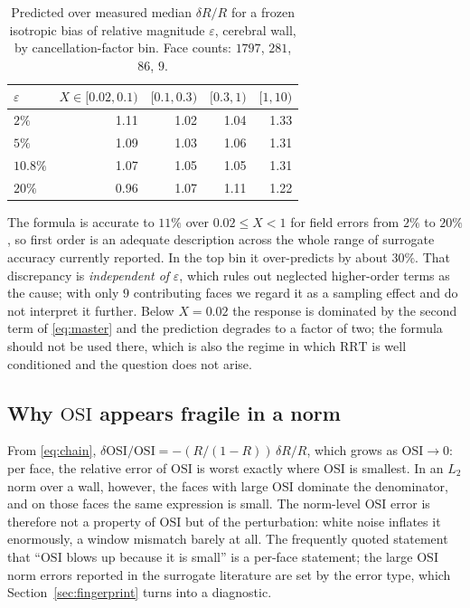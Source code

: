 \documentclass[11pt,a4paper]{article}
\newcommand{\OSI}{\mathrm{OSI}}
\newcommand{\RRT}{\mathrm{RRT}}
\newcommand{\eps}{\varepsilon}
\begin{document}
\begin{table}[t]
\centering
\caption{Predicted over measured median $\delta R/R$ for a frozen isotropic
bias of relative magnitude $\eps$, cerebral wall, by cancellation-factor bin.
Face counts: $1797$, $281$, $86$, $9$.}
\label{tab:validity}
\begin{tabular}{l r r r r}
\toprule
$\eps$ & $X\in[0.02,0.1)$ & $[0.1,0.3)$ & $[0.3,1)$ & $[1,10)$\\
\midrule
$2\%$    & 1.11 & 1.02 & 1.04 & 1.33\\
$5\%$    & 1.09 & 1.03 & 1.06 & 1.31\\
$10.8\%$ & 1.07 & 1.05 & 1.05 & 1.31\\
$20\%$   & 0.96 & 1.07 & 1.11 & 1.22\\
\bottomrule
\end{tabular}
\end{table}

The formula is accurate to $11\%$ over $0.02\le X<1$ for field errors from
$2\%$ to $20\%$, so first order is an adequate description across the whole
range of surrogate accuracy currently reported. In the top bin it
over-predicts by about $30\%$. That discrepancy is \emph{independent of}
$\eps$, which rules out neglected higher-order terms as the cause; with only
$9$ contributing faces we regard it as a sampling effect and do not interpret
it further. Below $X=0.02$ the response is dominated by the second term of
\eqref{eq:master} and the prediction degrades to a factor of two; the formula
should not be used there, which is also the regime in which $\RRT$ is well
conditioned and the question does not arise.

\subsection{Why $\OSI$ appears fragile in a norm}

From \eqref{eq:chain}, $\delta\OSI/\OSI=-(R/(1-R))\,\delta R/R$, which grows
as $\OSI\to0$: per face, the relative error of $\OSI$ is worst exactly where
$\OSI$ is smallest. In an $L_2$ norm over a wall, however, the faces with
large $\OSI$ dominate the denominator, and on those faces the same expression
is small. The norm-level $\OSI$ error is therefore not a property of $\OSI$
but of the perturbation: white noise inflates it enormously, a window
mismatch barely at all. The frequently quoted statement that ``$\OSI$ blows
up because it is small'' is a per-face statement; the large $\OSI$ norm
errors reported in the surrogate literature are set by the error type, which
Section~\ref{sec:fingerprint} turns into a diagnostic.
\end{document}
